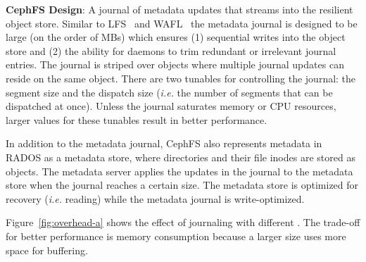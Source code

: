 \textbf{CephFS Design}: A journal of metadata updates that streams into the
resilient object store. Similar to LFS~\cite{rosenblum:acm1992-LFS} and
WAFL~\cite{hitz:wtec1994-WAFL} the metadata journal is designed to be large (on
the order of MBs) which ensures (1) sequential writes into the object store and
(2) the ability for daemons to trim redundant or irrelevant journal entries.
The journal is striped over objects where multiple journal updates can reside
on the same object. There are two tunables for controlling the journal: the segment size
and the dispatch size ({\it i.e.} the number of segments that can be dispatched
at once).  Unless the journal saturates memory or CPU resources, larger values
for these tunables result in better performance.

In addition to the metadata journal, CephFS also represents metadata in RADOS
as a metadata store, where directories and their file inodes are stored as
objects.  The metadata server applies the updates in the journal to the
metadata store when the journal reaches a certain size. The metadata store is
optimized for recovery ({\it i.e.} reading) while the metadata journal is
write-optimized.


Figure~\ref{fig:overhead-a} shows the effect of journaling with different
.  The trade-off for better performance
is memory consumption because a larger
 size uses more space for buffering.

